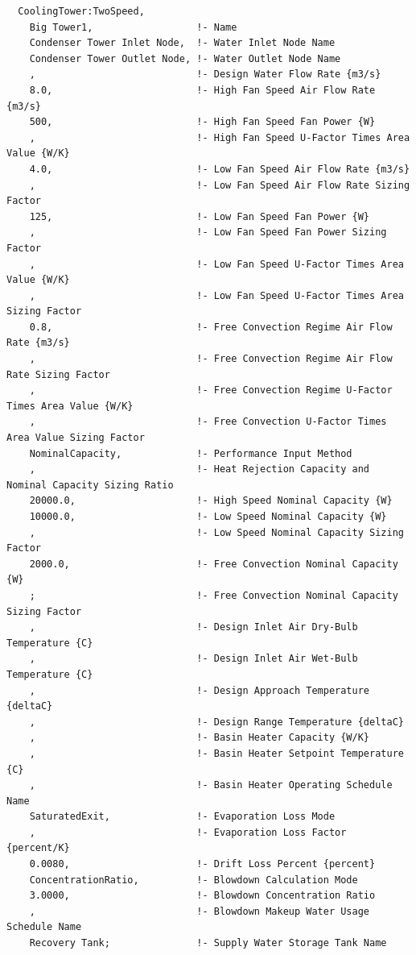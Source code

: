 \begin{lstlisting}
  CoolingTower:TwoSpeed,
    Big Tower1,                  !- Name
    Condenser Tower Inlet Node,  !- Water Inlet Node Name
    Condenser Tower Outlet Node, !- Water Outlet Node Name
    ,                            !- Design Water Flow Rate {m3/s}
    8.0,                         !- High Fan Speed Air Flow Rate {m3/s}
    500,                         !- High Fan Speed Fan Power {W}
    ,                            !- High Fan Speed U-Factor Times Area Value {W/K}
    4.0,                         !- Low Fan Speed Air Flow Rate {m3/s}
    ,                            !- Low Fan Speed Air Flow Rate Sizing Factor
    125,                         !- Low Fan Speed Fan Power {W}
    ,                            !- Low Fan Speed Fan Power Sizing Factor
    ,                            !- Low Fan Speed U-Factor Times Area Value {W/K}
    ,                            !- Low Fan Speed U-Factor Times Area Sizing Factor
    0.8,                         !- Free Convection Regime Air Flow Rate {m3/s}
    ,                            !- Free Convection Regime Air Flow Rate Sizing Factor
    ,                            !- Free Convection Regime U-Factor Times Area Value {W/K}
    ,                            !- Free Convection U-Factor Times Area Value Sizing Factor
    NominalCapacity,             !- Performance Input Method
    ,                            !- Heat Rejection Capacity and Nominal Capacity Sizing Ratio
    20000.0,                     !- High Speed Nominal Capacity {W}
    10000.0,                     !- Low Speed Nominal Capacity {W}
    ,                            !- Low Speed Nominal Capacity Sizing Factor
    2000.0,                      !- Free Convection Nominal Capacity {W}
    ;                            !- Free Convection Nominal Capacity Sizing Factor
    ,                            !- Design Inlet Air Dry-Bulb Temperature {C}
    ,                            !- Design Inlet Air Wet-Bulb Temperature {C}
    ,                            !- Design Approach Temperature {deltaC}
    ,                            !- Design Range Temperature {deltaC}
    ,                            !- Basin Heater Capacity {W/K}
    ,                            !- Basin Heater Setpoint Temperature {C}
    ,                            !- Basin Heater Operating Schedule Name
    SaturatedExit,               !- Evaporation Loss Mode
    ,                            !- Evaporation Loss Factor {percent/K}
    0.0080,                      !- Drift Loss Percent {percent}
    ConcentrationRatio,          !- Blowdown Calculation Mode
    3.0000,                      !- Blowdown Concentration Ratio
    ,                            !- Blowdown Makeup Water Usage Schedule Name
    Recovery Tank;               !- Supply Water Storage Tank Name



\end{lstlisting}
